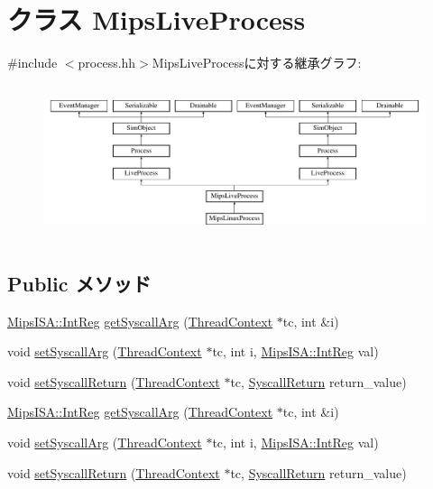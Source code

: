\hypertarget{classMipsLiveProcess}{
\section{クラス MipsLiveProcess}
\label{classMipsLiveProcess}
}


{\ttfamily \#include $<$process.hh$>$}MipsLiveProcessに対する継承グラフ:\begin{figure}[H]
\begin{center}
\leavevmode
\includegraphics[height=4.55285cm]{classMipsLiveProcess}
\end{center}
\end{figure}
\subsection*{Public メソッド}
\begin{DoxyCompactItemize}
\item 
\hyperlink{namespaceMipsISA_adf027691dfdcdef6002693b1e033700d}{MipsISA::IntReg} \hyperlink{classMipsLiveProcess_ae30d5e2e0fa415fc951786462325dde3}{getSyscallArg} (\hyperlink{classThreadContext}{ThreadContext} $\ast$tc, int \&i)
\item 
void \hyperlink{classMipsLiveProcess_a032ac505186d9587516a73cdc17f4c0d}{setSyscallArg} (\hyperlink{classThreadContext}{ThreadContext} $\ast$tc, int i, \hyperlink{namespaceMipsISA_adf027691dfdcdef6002693b1e033700d}{MipsISA::IntReg} val)
\item 
void \hyperlink{classMipsLiveProcess_aaefd02663c1eae206b851290d9276a5e}{setSyscallReturn} (\hyperlink{classThreadContext}{ThreadContext} $\ast$tc, \hyperlink{classSyscallReturn}{SyscallReturn} return\_\-value)
\item 
\hyperlink{namespaceMipsISA_adf027691dfdcdef6002693b1e033700d}{MipsISA::IntReg} \hyperlink{classMipsLiveProcess_ae30d5e2e0fa415fc951786462325dde3}{getSyscallArg} (\hyperlink{classThreadContext}{ThreadContext} $\ast$tc, int \&i)
\item 
void \hyperlink{classMipsLiveProcess_a032ac505186d9587516a73cdc17f4c0d}{setSyscallArg} (\hyperlink{classThreadContext}{ThreadContext} $\ast$tc, int i, \hyperlink{namespaceMipsISA_adf027691dfdcdef6002693b1e033700d}{MipsISA::IntReg} val)
\item 
void \hyperlink{classMipsLiveProcess_aaefd02663c1eae206b851290d9276a5e}{setSyscallReturn} (\hyperlink{classThreadContext}{ThreadContext} $\ast$tc, \hyperlink{classSyscallReturn}{SyscallReturn} return\_\-value)
\end{DoxyCompactItemize}
